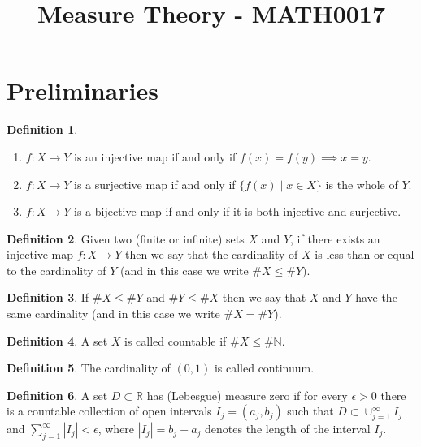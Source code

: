 \documentclass[a4paper,14pt]{extarticle}
\theoremstyle{definition}
\newtheorem{definition}{Definition}
\begin{document}
\title{\textbf{Measure Theory - MATH0017}}
\author{}
\date{}
\maketitle

\begingroup
\let\cleardoublepage\clearpage
\tableofcontents
\endgroup
\newpage
{}

\section{Preliminaries}
\begin{definition}
  \hfill
  \begin{enumerate}
    \item $f:X\rightarrow Y$ is an injective map if and only if $f(x)=f(y)\implies x= y$.
    \item $f:X\rightarrow Y$ is a surjective map if and only if $\{f(x)\mid x\in X\}$ is the whole of $Y$.
    \item $f:X\rightarrow Y$ is a bijective map if and only if it is both injective and surjective.
  \end{enumerate}
\end{definition}
\begin{definition}
  Given two (finite or infinite) sets 
  $X$ and $Y$, if there exists an 
  injective map $f:X\rightarrow Y$ then
  we say that the cardinality of $X$ 
  is less than or equal to the cardinality of $Y$ (and in this case
  we write $\#X\leq\#Y)$.
\end{definition}
\begin{definition}
  If $\#X\leq\#Y$ and $\#Y\leq\#X$ then 
  we say that $X$ and $Y$ have the same
  cardinality (and in this case we 
  write $\#X=\#Y$).
\end{definition}
\begin{definition}
  A set $X$ is called countable if 
  $\#X\leq \#\mathbb{N}$.
\end{definition}
\begin{definition}
  The cardinality of $(0,1)$ is called 
  continuum.
\end{definition}
\begin{definition}
  A set $D\subset\mathbb{R}$ has (Lebesgue) measure zero if for every
  $\epsilon>0$ there is a countable 
  collection of open intervals $I_j=
  (a_j,b_j)$ such that $D\subset\cup_{j=1}^\infty I_j$ and $\sum_{j=1}^\infty |I_j|<\epsilon$, where 
  $|I_j|=b_j-a_j$ denotes the length of 
  the interval $I_j$.
\end{definition}
\newpage
\end{document}
